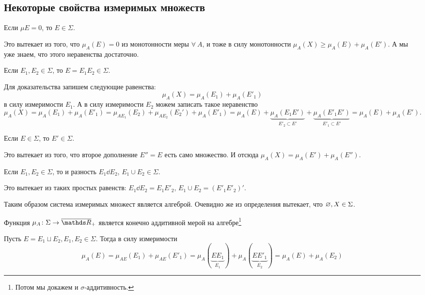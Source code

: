 \subsection{Некоторые свойства измеримых множеств}
\begin{Ut}
  Если $\mu E=0$, то $E\in\Sigma$.
\end{Ut}
\begin{Proof}
 Это вытекает из того, что $\mu_A(E)=0$ из монотонности меры $\forall\ A$, и тоже в силу монотонности $\mu_A(X)\ge\mu_A(E)+\mu_A(E')$. А мы уже знаем, что этого неравенства достаточно.
\end{Proof}
\begin{Ut}
  Если $E_1,E_2\in\Sigma$, то $E=E_1E_2\in\Sigma$.
\end{Ut}
\begin{Proof}
 Для доказательства запишем следующие равенства:
\[\mu_A(X) = \mu_A(E_1)+\mu_A(E'_1)\]
в силу измеримости $E_1$. А в силу измеримости $E_2$ можем записать такое неравенство
\[\mu_A(X) = \mu_A(E_1)+\mu_A(E'_1)=\mu_{AE_1}(E_2)+\mu_{AE_2}(E_2')+\mu_A(E'_1) 
 = \mu_A(E) + \underbrace{\mu_A(E_1E')}_{E'_2\subset E'}+\underbrace{\mu_A(E'_1E')}_{E'_1\subset E'}=\mu_A(E)+\mu_A(E').\]
\end{Proof}
\begin{Ut}
  Если $E\in\Sigma$, то $E'\in\Sigma$.
\end{Ut}
\begin{Proof}
  Это вытекает из того, что второе дополнение $E''=E$ есть само множество. И отсюда $\mu_A(X)=\mu_A(E')+\mu_A(E'')$.
\end{Proof}
\begin{Ut}
  Если $E_1,E_2\in\Sigma$, то и разность $E_1\dd E_2$, $E_1\cup E_2\in \Sigma$.
\end{Ut}
\begin{Proof}
  Это вытекает из таких простых равенств: $E_1\dd E_2 = E_1E'_2$, $E_1\cup E_2 = (E'_1E'_2)'$.
\end{Proof}

Таким образом система измеримых множест является алгеброй. Очевидно же из определения вытекает, что $\varnothing,X\in\Sigma$.
\begin{Ut}
  Функция $\mu_A\colon\Sigma\to\ol\R_+$ является конечно аддитивной мерой на алгебре\footnote{Потом мы докажем и $\sigma$-аддитивность.}
\end{Ut}

\begin{Proof}
  Пусть $E=E_1\sqcup E_2,E_1,E_2\in\Sigma$. Тогда в силу измеримости
\[
  \mu_A(E)=\mu_{AE}(E_1)+\mu_{AE}(E'_1)=
  \mu_{A}(\underbrace{EE_1}_{E_1})+\mu_A(\underbrace{EE'_1}_{E_2})=\mu_A(E)+\mu_A(E_2)
\]
\end{Proof}

